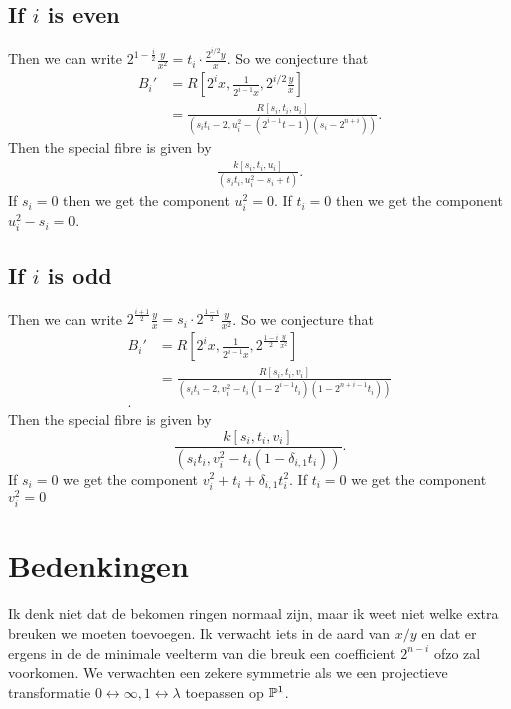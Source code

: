 \subsection{If $i$ is even } \label{sec:if_i_is_even_and_i_g_0}
Then we can write $2^{1-\frac{i}{2}}\frac{y}{x^2} =  t_i\cdot \frac{2^{i / 2}y}{x}$. So we conjecture that \begin{align*}
	B_i' &= R\left[2^{i}x, \frac{1}{2^{i-1}x}, 2^{i / 2} \frac{y}{x}\right] \\
	     &= \frac{R[s_i, t_i, u_i]}{(s_it_i - 2, u_i^2 - (2^{i-1}t - 1)(s_i  - 2^{n + i}))} 
.\end{align*} 
Then the special fibre is given by 
\begin{align*}
	\frac{k[s_i, t_i, u_i]}{(s_it_i, u_i^2- s_i +  t)}
.\end{align*}
If $s_i = 0$ then we get the component $u_i^2 = 0$.
If $t_i = 0$ then we get the component $u_i^2 - s_i = 0$.

\subsection{If $i$ is odd} \label{sec:if_i_is_odd}

Then we can write $2^{\frac{i + 1}{2}}\frac{y}{x} = s_i \cdot 2^{\frac{1-i}{2}} \frac{y}{x^2}$. 
So we conjecture that \begin{align*}
	B_i' &= R\left[2^{i} x, \frac{1}{2^{i-1}x}, 2^{\frac{1-i}{2}\frac{y}{x^2}}\right] \\
	     &= \frac{R[s_i, t_i, v_i]}{(s_i t_i -2,v_i^2 - t_i(1-2^{i-1}t_i)(1-2^{n + i -1}t_i))} \\
.\end{align*} 
Then the special fibre is given by \[
	\frac{k[s_i, t_i, v_i]}{(s_i t_i, v_i^2 - t_i (1 - \delta_{i,1}t_i))}
.\] 
If $s_i = 0$ we get the component $v_i^2 + t_i + \delta_{i, 1} t_i^2$. 
If $t_i = 0$ we get the component $v_i^2 = 0$

\section{Bedenkingen} \label{sec:bedenkingen}

Ik denk niet dat de bekomen ringen normaal zijn, maar ik weet niet welke extra breuken we moeten toevoegen. 
Ik verwacht iets in de aard van $x / y$ en dat er ergens in de de minimale veelterm van die breuk een coefficient $2^{n-i}$ ofzo zal voorkomen.
We verwachten een zekere symmetrie als we een projectieve transformatie $0 \leftrightarrow \infty, 1 \leftrightarrow \lambda$ toepassen op $\mathbb{P}^{1}$. 

